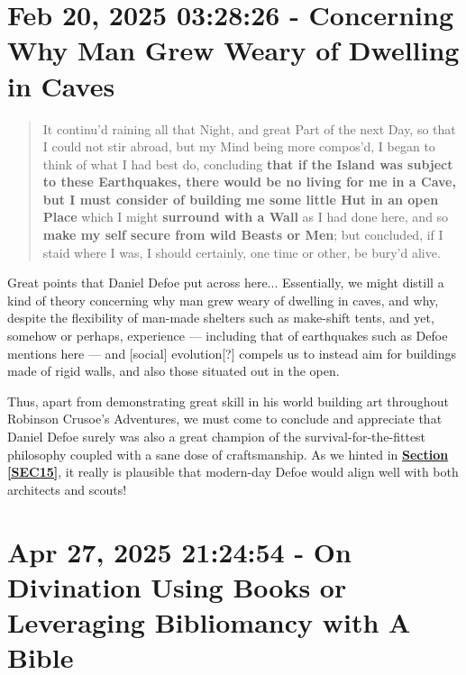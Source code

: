 \documentclass[a4paper]{article}
\begin{document}
\section{Feb 20, 2025 03:28:26 - Concerning Why Man Grew Weary of Dwelling in Caves}
\label{SEC18}



\noindent
\begin{minipage}{1\textwidth}
\vspace{1em}
\begin{quotation}
{\ttfamily


It continu’d raining all that Night, and great Part of the next Day, so that I could not stir abroad, but my Mind being more compos’d, I began to think of what I had best do, concluding \textbf{that if the Island was subject to these Earthquakes, there would be no living for me in a Cave, but I must consider of building me some little Hut in an open Place} which I might \textbf{surround with a Wall} as I had done here, and so \textbf{make my self secure from wild Beasts or Men}; but concluded, if I staid where I was, I should certainly, one time or other, be bury’d alive.


}
\end{quotation}
\vspace{1em}
\end{minipage}


Great points that Daniel Defoe put across here... Essentially, we might distill a kind of theory concerning why man grew weary of dwelling in caves, and why, despite the flexibility of man-made shelters such as make-shift tents, and yet, somehow or perhaps, experience --- including that of earthquakes such as Defoe mentions here --- and [social] evolution[?] compels us to instead aim for buildings made of rigid walls, and also those situated out in the open.

Thus, apart from demonstrating great skill in his world building art throughout Robinson Crusoe's Adventures, we must come to conclude and appreciate that Daniel Defoe surely was also a great champion of the survival-for-the-fittest philosophy coupled with a sane dose of craftsmanship. As we hinted in \textbf{\hyperref[SEC15]{Section \ref{SEC15}}}, it really is plausible that modern-day Defoe would align well with both architects and scouts!




\section{Apr 27, 2025 21:24:54 - On Divination Using Books or Leveraging Bibliomancy with A Bible}
\label{SEC19}
\end{document}
